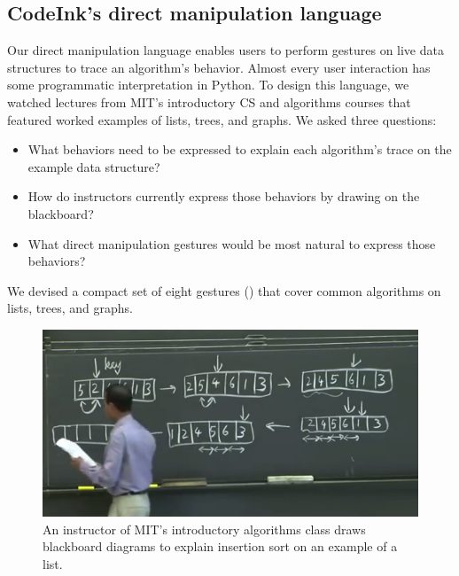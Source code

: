 \subsection{CodeInk's direct manipulation language}

Our direct manipulation language enables users to perform gestures on live data
structures to trace an algorithm's behavior. Almost every user interaction
has some programmatic interpretation in Python.
To design this language, we watched lectures from MIT's
introductory CS and algorithms courses that featured worked examples of
lists, trees, and graphs. We asked three questions:

\begin{itemize}

  \item What behaviors need to be expressed to explain each algorithm's
  trace on the example data structure?

  \item How do instructors currently express those behaviors by drawing
  on the blackboard?

  \item What direct manipulation gestures would be most natural to
  express those behaviors?

\end{itemize}

We devised a compact set of eight gestures ()
that cover common algorithms on lists, trees, and graphs.



\begin{figure}

\begin{center}
\includegraphics[width=0.7\columnwidth]{img/6006/insertion.png}
\end{center}

\vspace{-0.75em}
\caption{An instructor of MIT's introductory algorithms class draws
blackboard diagrams to explain insertion sort on an example of a list.}
\vspace{-0.75em}
\label{fig:6006-insertion}
\end{figure}


